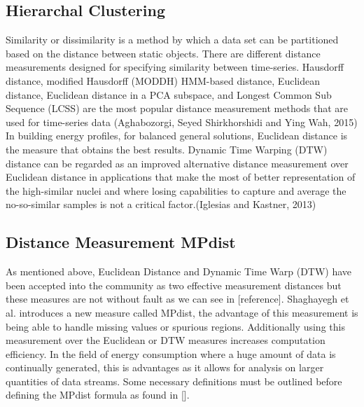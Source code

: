 \subsection{Hierarchal Clustering}
Similarity or dissimilarity is a method by which a data set can be partitioned based on the distance between static objects. There are different distance measurements designed for specifying similarity between time-series. Hausdorff distance, modified Hausdorff (MODDH) HMM-based distance, Euclidean distance, Euclidean distance in a PCA subspace, and Longest Common Sub Sequence (LCSS) are the most popular distance measurement methods that are used for time-series data (Aghabozorgi, Seyed Shirkhorshidi and Ying Wah, 2015)\\
In building energy profiles, for balanced general solutions, Euclidean distance is the measure that obtains the best results. Dynamic Time Warping (DTW) distance can be regarded as an improved alternative distance measurement over Euclidean distance in applications that make the most of better representation of the high-similar nuclei and where losing capabilities to capture and average the no-so-similar samples is not a critical factor.(Iglesias and Kastner, 2013)\\

\subsection{Distance Measurement MPdist}
As mentioned above, Euclidean Distance and Dynamic Time Warp (DTW) have been accepted into the community as two effective measurement distances but these measures are not without fault as we can see in [reference]. Shaghayegh et al. introduces a new measure called MPdist, the advantage of this measurement is being able to handle missing values or spurious regions. Additionally using this measurement over the Euclidean or DTW measures increases computation efficiency. In the field of energy consumption where a huge amount of data is continually generated, this is advantages as it allows for analysis on larger quantities of data streams. Some necessary definitions must be outlined before defining the MPdist formula as found in [].\\


